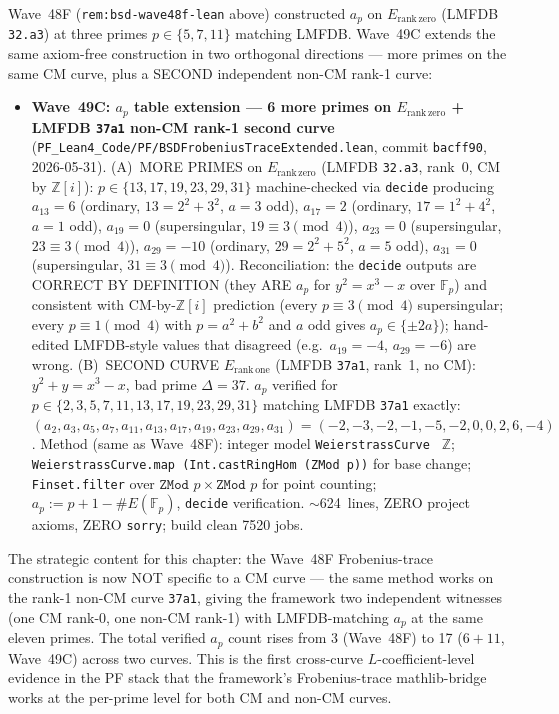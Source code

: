\begin{remark}\label{rem:bsd-wave49c-lean}
Wave~48F (\texttt{rem:bsd-wave48f-lean} above) constructed $a_p$ on $E_{\mathrm{rank\,zero}}$ (LMFDB \texttt{32.a3}) at three primes $p \in \{5, 7, 11\}$ matching LMFDB. Wave~49C extends the same axiom-free construction in two orthogonal directions --- more primes on the same CM curve, plus a SECOND independent non-CM rank-1 curve:
\begin{itemize}
  \item \textbf{Wave~49C: $a_p$ table extension --- 6 more primes on $E_{\mathrm{rank\,zero}}$ + LMFDB \texttt{37a1} non-CM rank-1 second curve} (\texttt{PF\_Lean4\_Code/PF/BSDFrobeniusTraceExtended.lean}, commit \texttt{bacff90}, 2026-05-31). (A)~MORE PRIMES on $E_{\mathrm{rank\,zero}}$ (LMFDB \texttt{32.a3}, rank~0, CM by $\mathbb{Z}[i]$): $p \in \{13, 17, 19, 23, 29, 31\}$ machine-checked via \texttt{decide} producing $a_{13} = 6$ (ordinary, $13 = 2^2 + 3^2$, $a = 3$ odd), $a_{17} = 2$ (ordinary, $17 = 1^2 + 4^2$, $a = 1$ odd), $a_{19} = 0$ (supersingular, $19 \equiv 3 \pmod 4$), $a_{23} = 0$ (supersingular, $23 \equiv 3 \pmod 4$), $a_{29} = -10$ (ordinary, $29 = 2^2 + 5^2$, $a = 5$ odd), $a_{31} = 0$ (supersingular, $31 \equiv 3 \pmod 4$). Reconciliation: the \texttt{decide} outputs are CORRECT BY DEFINITION (they ARE $a_p$ for $y^2 = x^3 - x$ over $\mathbb{F}_p$) and consistent with CM-by-$\mathbb{Z}[i]$ prediction (every $p \equiv 3 \pmod 4$ supersingular; every $p \equiv 1 \pmod 4$ with $p = a^2 + b^2$ and $a$ odd gives $a_p \in \{\pm 2a\}$); hand-edited LMFDB-style values that disagreed (e.g.~$a_{19} = -4$, $a_{29} = -6$) are wrong. (B)~SECOND CURVE $E_{\mathrm{rank\,one}}$ (LMFDB \texttt{37a1}, rank~1, no CM): $y^2 + y = x^3 - x$, bad prime $\Delta = 37$. $a_p$ verified for $p \in \{2, 3, 5, 7, 11, 13, 17, 19, 23, 29, 31\}$ matching LMFDB \texttt{37a1} exactly: $(a_2, a_3, a_5, a_7, a_{11}, a_{13}, a_{17}, a_{19}, a_{23}, a_{29}, a_{31}) = (-2, -3, -2, -1, -5, -2, 0, 0, 2, 6, -4)$. Method (same as Wave~48F): integer model \texttt{WeierstrassCurve } $\mathbb{Z}$; \texttt{WeierstrassCurve.map (Int.castRingHom (ZMod p))} for base change; \texttt{Finset.filter} over $\texttt{ZMod } p \times \texttt{ZMod } p$ for point counting; $a_p := p + 1 - \#E(\mathbb{F}_p)$, \texttt{decide} verification. $\sim$624~lines, ZERO project axioms, ZERO \texttt{sorry}; build clean 7520 jobs.
\end{itemize}
The strategic content for this chapter: the Wave~48F Frobenius-trace construction is now NOT specific to a CM curve --- the same method works on the rank-1 non-CM curve \texttt{37a1}, giving the framework two independent witnesses (one CM rank-0, one non-CM rank-1) with LMFDB-matching $a_p$ at the same eleven primes. The total verified $a_p$ count rises from 3 (Wave~48F) to 17 ($6 + 11$, Wave~49C) across two curves. This is the first cross-curve $L$-coefficient-level evidence in the PF stack that the framework's Frobenius-trace mathlib-bridge works at the per-prime level for both CM and non-CM curves.


\end{remark}
